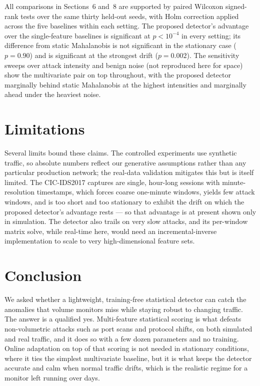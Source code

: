 \documentclass[11pt,a4paper]{article}
\begin{document}
All comparisons in Sections~6 and~8 are supported by paired Wilcoxon signed-rank
tests over the same thirty held-out seeds, with Holm correction applied across
the five baselines within each setting. The proposed detector's advantage over the
single-feature baselines is significant at $p < 10^{-4}$ in every setting; its
difference from static Mahalanobis is not significant in the stationary case
($p = 0.90$) and is significant at the strongest drift ($p = 0.002$). The
sensitivity sweeps over attack intensity and benign noise (not reproduced here for
space) show the multivariate pair on top throughout, with the proposed detector
marginally behind static Mahalanobis at the highest intensities and marginally
ahead under the heaviest noise.

\section{Limitations}
Several limits bound these claims. The controlled experiments use synthetic
traffic, so absolute numbers reflect our generative assumptions rather than any
particular production network; the real-data validation mitigates this but is
itself limited. The CIC-IDS2017 captures are single, hour-long sessions with
minute-resolution timestamps, which forces coarse one-minute windows, yields few
attack windows, and is too short and too stationary to exhibit the drift on which
the proposed detector's advantage rests --- so that advantage is at present shown
only in simulation. The detector also trails on very slow attacks, and its
per-window matrix solve, while real-time here, would need an incremental-inverse
implementation to scale to very high-dimensional feature sets.

\section{Conclusion}
We asked whether a lightweight, training-free statistical detector can catch the
anomalies that volume monitors miss while staying robust to changing traffic. The
answer is a qualified yes. Multi-feature statistical scoring is what defeats
non-volumetric attacks such as port scans and protocol shifts, on both simulated
and real traffic, and it does so with a few dozen parameters and no training.
Online adaptation on top of that scoring is not needed in stationary conditions,
where it ties the simplest multivariate baseline, but it is what keeps the
detector accurate and calm when normal traffic drifts, which is the realistic
regime for a monitor left running over days.
\end{document}

